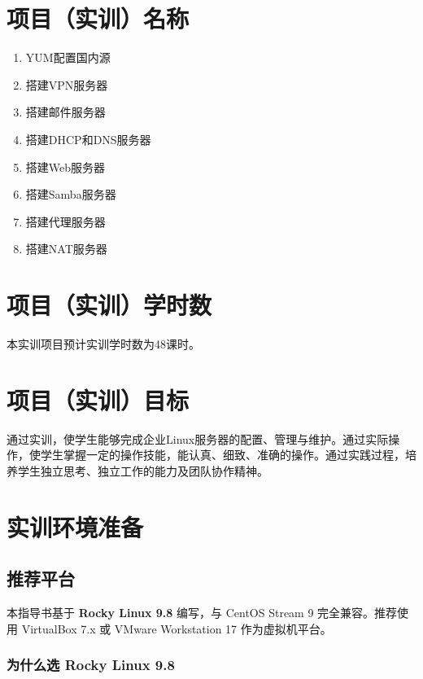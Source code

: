 \documentclass[12pt,a4paper]{ctexart}
\begin{document}
\section{项目（实训）名称}

\begin{enumerate}[label=\arabic*.,leftmargin=*]
  \item YUM配置国内源
  \item 搭建VPN服务器
  \item 搭建邮件服务器
  \item 搭建DHCP和DNS服务器
  \item 搭建Web服务器
  \item 搭建Samba服务器
  \item 搭建代理服务器
  \item 搭建NAT服务器
\end{enumerate}

\section{项目（实训）学时数}

本实训项目预计实训学时数为48课时。

\section{项目（实训）目标}

通过实训，使学生能够完成企业Linux服务器的配置、管理与维护。通过实际操作，使学生掌握一定的操作技能，能认真、细致、准确的操作。通过实践过程，培养学生独立思考、独立工作的能力及团队协作精神。

\section{实训环境准备}

\subsection{推荐平台}

\begin{infobox}
  本指导书基于 \textbf{Rocky Linux 9.8} 编写，与 CentOS Stream 9 完全兼容。推荐使用 VirtualBox 7.x 或 VMware Workstation 17 作为虚拟机平台。
\end{infobox}

\subsubsection{为什么选 Rocky Linux 9.8}
\end{document}
